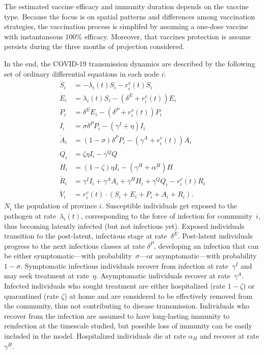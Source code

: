 The estimated vaccine efficacy and immunity duration depends on the vaccine type. Because the focus is on spatial patterns and differences among vaccination strategies, the vaccination process is simplifed by assuming a one-dose vaccine with instantaneous 100\% efficacy. %
Moreover, that vaccines protection is assume persists during the three months of projection considered.

In the end, the COVID-19 transmission dynamics are described by the following set of ordinary differential equations in each node $i$: 
\begin{equation}\label{eq:sepiar}
\begin{split}
    \dot{S}_i &= - \lambda_i(t) S_i - r^v_i(t) S_i \\
    \dot{E}_i &= \lambda_i(t) S_i -  (\delta^E + r^v_i(t)) E_i \\
    \dot{P}_i &= \delta^E E_i -  (\delta^P+r^v_i(t))  P_i \\
    \dot{I}_i &= \sigma \delta^P P_i - (\gamma^I + \eta)  I_i \\
    \dot{A}_i &= (1 - \sigma) \delta^P P_i - (\gamma^A+ r^v_i(t)) A_i \\
    \dot{Q}_i &= \zeta \eta I_i - \gamma^Q Q \\
    \dot{H}_i &= (1-\zeta) \eta I_i - (\gamma^H + \alpha^H)H \\
    \dot{R}_i &= \gamma^I I_i + \gamma^A A_i + \gamma^H H_i + \gamma^Q Q_i - r^v_i(t) R_i\\
    \dot{V}_i &= r^v_i(t) \cdot (S_i + E_i + P_i + A_i + R_i).
\end{split}
\end{equation}
$N_i$ the population of province $i$. Susceptible individuals get exposed to the pathogen at rate~$\lambda_i(t)$, corresponding to the force of infection for community~$i$, thus becoming latently infected (but not infectious yet). Exposed individuals transition to the post-latent, infectious stage at rate~$\delta^E$. Post-latent individuals progress to the next infectious classes at rate $\delta^P$, developing an infection that can be either symptomatic---with probability~$\sigma$---or asymptomatic---with probability $1 - \sigma$. Symptomatic infectious individuals recover from infection at rate~$\gamma^I$ and may seek treatment at rate~$\eta$. Asymptomatic individuals recover at rate~$\gamma^A$.  Infected individuals who sought treatment are either hospitalized (rate $1-\zeta$) or quarantined (rate $\zeta$) at home and are considered to be effectively removed from the community, thus not contributing to disease transmission. Individuals who recover from the infection are assumed to have long-lasting immunity to reinfection at the timescale studied, but possible loss of immunity can be easily included in the model. Hospitalized individuals die at rate $\alpha_H$ and recover at rate $\gamma^H$.

